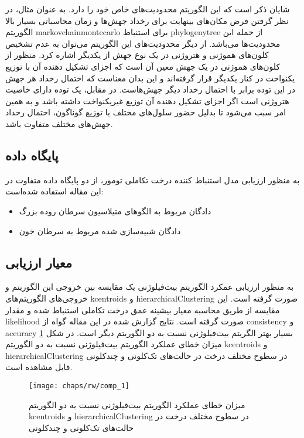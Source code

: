 شایان ذکر است که این الگوریتم محدودیت‌های خاص خود را دارد. به عنوان مثال، در نظر گرفتن فرض مکان‌های بینهایت برای رخداد جهش‌ها و زمان محاسباتی بسیار بالا الگوریتم \gls{markovchainmontecarlo} برای استنباط \gls{phylogenytree} از جمله این محدودیت‌ها می‌باشد. از دیگر محدودیت‌های این الگوریتم می‌توان به عدم تشخیص کلون‌های هموژنی و هتروژنی در یک نوع جهش از یکدیگر اشاره کرد. منظور از کلون‌های هموژنی در یک جهش معین آن است که اجزای تشکیل دهنده آن با توزیع یکنواخت در کنار یکدیگر قرار گرفته‌اند و این بدان معناست که احتمال رخداد هر جهش در این توده برابر با احتمال رخداد دیگر جهش‌هاست. در مقابل، یک توده دارای خاصیت هتروژنی است اگر اجزای تشکیل دهنده آن توزیع غیریکنواخت داشته باشد و به همین امر سبب می‌شود تا بدلیل حضور سلول‌های مختلف با توزیع گوناگون، احتمال رخداد جهش‌های مختلف متفاوت باشد. 

\subsection{پایگاه داده}
به منظور ارزیابی مدل استنباط کننده درخت تکاملی تومور، از دو پایگاه داده متفاوت در این مقاله استفاده شده‌است: 
\begin{itemize}
	\item دادگان مربوط به الگوهای متیلاسیون سرطان روده بزرگ
	\item دادگان شبیه‌سازی شده مربوط به سرطان خون
\end{itemize}
 

\subsection{معیار ارزیابی}
 به منظور ارزیابی عمکرد الگوریتم بیت‌فیلوژنی یک مقایسه بین خروجی این الگوریتم و خروجی‌های الگوریتم‌های \gls{kcentroids} و \gls{hierarchicalClustering} صورت گرفته است. این مقایسه از طریق محاسبه معیار بیشینه عمق درخت تکاملی استنباط شده و مقدار \gls{likelihood} صورت گرفته است. نتایج گزارش شده در این مقاله گواه از \gls{consistency} و \gls{accuracy} بسیار بهتر الگریتم بیت‌فیلوژنی  نسبت به دو الگوریتم دیگر است. در شکل \ref{fig:ch_rw:comp_1} میزان خطای عملکرد الگوریتم بیت‌فیلوژنی نسبت به دو الگوریتم \gls{kcentroids} و \gls{hierarchicalClustering} در سطوح مختلف درخت در حالت‌های تک‌کلونی و چندکلونی قابل مشاهده است.
 
\begin{figure}[!ht]
	\centerline{\texttt{[image: chaps/rw/comp\_1]}}
	\caption{میزان خطای عملکرد الگوریتم بیت‌فیلوژنی نسبت به دو الگوریتم \gls{kcentroids} و \gls{hierarchicalClustering} در سطوح مختلف درخت در حالت‌های تک‌کلونی و چندکلونی \cite{yuan2015bitphylogeny}}
	\label{fig:ch_rw:comp_1}
\end{figure}

